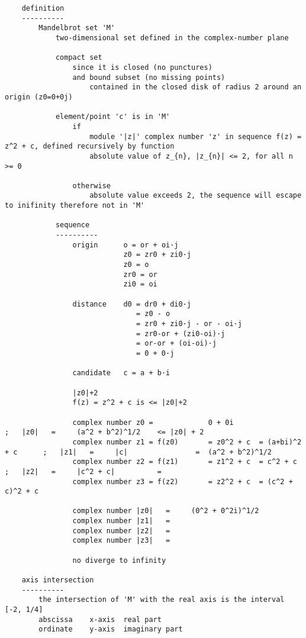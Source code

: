 \begin{verbatim}
    definition
    ----------
        Mandelbrot set 'M'
            two-dimensional set defined in the complex-number plane

            compact set
                since it is closed (no punctures)
                and bound subset (no missing points)
                    contained in the closed disk of radius 2 around an origin (z0=0+0j)

            element/point 'c' is in 'M'
                if
                    module '|z|' complex number 'z' in sequence f(z) = z^2 + c, defined recursively by function
                    absolute value of z_{n}, |z_{n}| <= 2, for all n >= 0

                otherwise 
                    absolute value exceeds 2, the sequence will escape to inifinity therefore not in 'M'

            sequence
            ----------
                origin      o = or + oi·j
                            z0 = zr0 + zi0·j
                            z0 = o
                            zr0 = or
                            zi0 = oi

                distance    d0 = dr0 + di0·j
                               = z0 - o
                               = zr0 + zi0·j - or - oi·j
                               = zr0-or + (zi0-oi)·j
                               = or-or + (oi-oi)·j
                               = 0 + 0·j
    
                candidate   c = a + b·i 

                |z0|+2
                f(z) = z^2 + c is <= |z0|+2

                complex number z0 =             0 + 0i                          ;   |z0|   =     (a^2 + b^2)^1/2    <= |z0| + 2
                complex number z1 = f(z0)       = z0^2 + c  = (a+bi)^2 + c      ;   |z1|   =     |c|                =  (a^2 + b^2)^1/2
                complex number z2 = f(z1)       = z1^2 + c  = c^2 + c           ;   |z2|   =     |c^2 + c|          = 
                complex number z3 = f(z2)       = z2^2 + c  = (c^2 + c)^2 + c

                complex number |z0|   =     (0^2 + 0^2i)^1/2
                complex number |z1|   = 
                complex number |z2|   = 
                complex number |z3|   = 
                
                no diverge to infinity

    axis intersection
    ----------
        the intersection of 'M' with the real axis is the interval [-2, 1/4]
        abscissa    x-axis  real part
        ordinate    y-axis  imaginary part


\end{verbatim}
